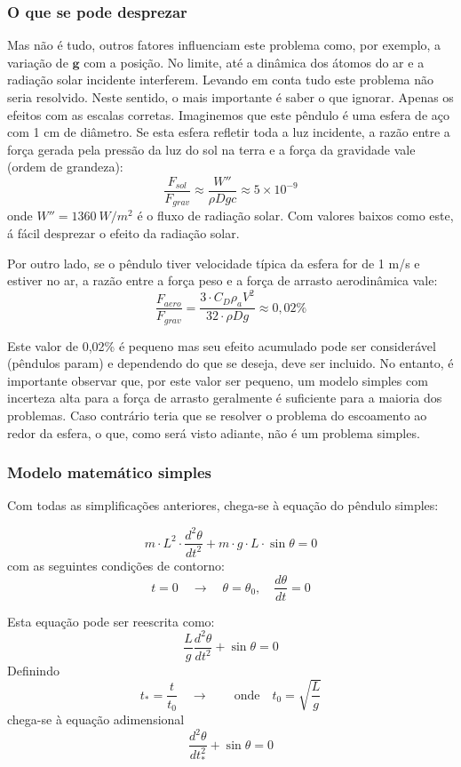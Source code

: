 \documentclass[article,12pt,oneside,a4paper,english,brazil,sumario=tradicional]{abntex2}
\newcommand{\lra}{\ensuremath{\longrightarrow}}
\newcommand{\qrq}{\ensuremath{\quad\lra\quad}}
\begin{document}
\subsubsection{O que se pode desprezar}
Mas não é tudo, outros fatores influenciam este problema como, por exemplo, a variação de $\textbf{g}$ com a posição. No limite, até a dinâmica dos átomos do ar e a radiação solar incidente interferem. Levando em conta tudo este problema não seria resolvido. Neste sentido, o mais importante é saber o que ignorar. Apenas os efeitos com as escalas corretas. Imaginemos que este pêndulo é uma esfera de aço com 1 cm de diâmetro. Se esta esfera refletir toda a luz incidente, a razão entre a força gerada pela pressão da luz do sol na terra e a força da gravidade vale (ordem de grandeza):
\[
\frac{F_{sol}}{F_{grav}} \approx \frac{W''}{\rho D g c} \approx 5\times 10^{-9}
\]
onde $W''=1360\:W/m^2$ é o fluxo de radiação solar. Com valores baixos como este, á fácil desprezar o efeito da radiação solar. 

Por outro lado, se o pêndulo tiver velocidade típica da esfera for de 1 m/s e estiver no ar, a razão entre a força peso e a força de arrasto aerodinâmica vale:
\[
\frac{F_{aero}}{F_{grav}} = \frac{3\cdot C_D \rho_a V^2}{32\cdot\rho D g} \approx 0,02\%
\]

Este valor de 0,02\% é pequeno mas seu efeito acumulado pode ser considerável (pêndulos param) e dependendo do que se deseja, deve ser incluido. No entanto, é importante observar que, por este valor ser pequeno, um modelo simples com incerteza alta para a força de arrasto geralmente é suficiente para a maioria dos problemas. Caso contrário teria que se resolver o problema do escoamento ao redor da esfera, o que, como será visto adiante, não é um problema simples.

\subsubsection{Modelo matemático simples}
Com todas as simplificações anteriores, chega-se à equação do pêndulo simples:

\[
m\cdot L^2\cdot\frac{d^2\theta}{dt^2} + m\cdot g\cdot L\cdot \sin\theta = 0
\]
com as seguintes condições de contorno:
\[
t = 0 \qrq \theta=\theta_0, \quad\frac{d\theta}{dt} = 0
\]

Esta equação pode ser reescrita como:
\[
\frac{L}{g}\frac{d^2\theta}{dt^2} + \sin\theta = 0 
\]
Definindo 
\[
t_* = \frac{t}{t_0}\qrq \quad\text{onde}\quad t_0 = \sqrt{\frac{L}{g}}
\]
chega-se à equação adimensional
\[
\frac{d^2\theta}{dt_*^2} + \sin\theta = 0 
\]
\end{document}
